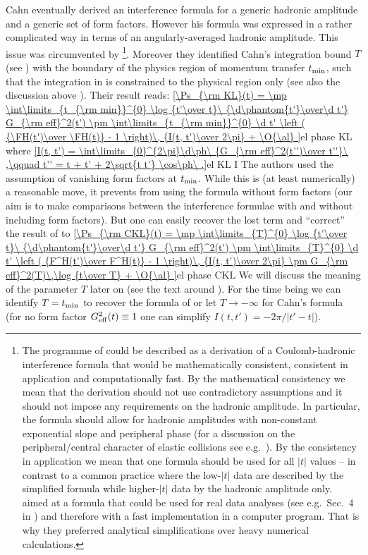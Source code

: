 Cahn eventually derived an interference formula for a generic hadronic amplitude and a generic set of form factors. However his formula was expressed in a rather complicated way in terms of an angularly-averaged hadronic amplitude. This issue was circumvented by \KaL{} \footnote{%
The programme of \KaL{} could be described as a derivation of a Coulomb-hadronic interference formula that would be mathematically consistent, consistent in application and computationally fast. By the mathematical consistency we mean that the derivation should not use contradictory assumptions and it should not impose any requirements on the hadronic amplitude. In particular, the formula should allow for hadronic amplitudes with non-constant exponential slope and peripheral phase (for a discussion on the peripheral/central character of elastic collisions see e.g.~). By the consistency in application we mean that one formula should be used for all $|t|$ values -- in contrast to a common practice where the low-$|t|$ data are described by the simplified \WaY{} formula while higher-$|t|$ data by the hadronic amplitude only. \KaL{} aimed at a formula that could be used for real data analyses (see e.g.~Sec.~4 in ) and therefore with a fast implementation in a computer program. That is why they preferred analytical simplifications over heavy numerical calculations.
}. Moreover they identified Cahn's integration bound $T$ (see ) with the boundary of the physics region of momentum transfer $t_{\rm min}$, such that the integration in  is constrained to the physical region only (see also the discussion above ). Their result reads:
\eqref{\Ps_{\rm KL}(t) =
	\mp \int\limits_{t_{\rm min}}^{0} \log {t'\over t}\ {\d\phantom{t'}\over\d t'} G_{\rm eff}^2(t')
	\pm \int\limits_{t_{\rm min}}^{0} \d t' \left ( {\FH(t')\over \FH(t)} - 1 \right)\, {I(t, t')\over 2\pi}
	+ \O{\al}
}{el phase KL}
where
\eqref{I(t, t') = \int\limits_{0}^{2\pi}\d\ph\ {G_{\rm eff}^2(t'')\over t''}\ ,\qquad t'' = t + t' + 2\sqrt{t t'} \cos\ph\ .}{el KL I}
The authors used the assumption of vanishing form factors at $t_{\rm min}$. While this is (at least numerically) a reasonable move, it prevents from using the formula without form factors (our aim is to make comparisons between the interference formulae with and without including form factors). But one can easily recover the lost term and ``correct'' the result of \KL{} to
\eqref{\Ps_{\rm CKL}(t) =
	\mp \int\limits_{T}^{0} \log {t'\over t}\ {\d\phantom{t'}\over\d t'} G_{\rm eff}^2(t')
	\pm \int\limits_{T}^{0} \d t' \left ( {F^H(t')\over F^H(t)} - 1 \right)\, {I(t, t')\over 2\pi}
	\pm G_{\rm eff}^2(T)\,\log {t\over T}
	+ \O{\al}
}{el phase CKL}
We will discuss the meaning of the parameter $T$ later on (see the text around ). For the time being we can identify $T = t_{\rm min}$ to recover the formula of \KL{} or let $T\to -\infty$ for Cahn's formula (for no form factor $G_{\rm eff}^2(t) \equiv 1$ one can simplify $I(t, t') = -2\pi / |t' - t|$).

